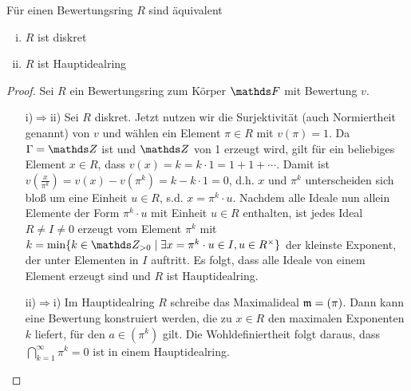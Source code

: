 \documentclass[ngerman,fontsize=11pt, paper=a4, parskip=half, titlepage=true, toc=bib]{scrartcl}
\begin{document}
\begin{Lem}\label{bewertungsringhir}
  Für einen Bewertungsring $R$ sind äquivalent
  \begin{enumerate}[i)]
  \item $R$ ist diskret
  \item $R$ ist Hauptidealring
  \end{enumerate}
  \begin{proof}
    Sei $R$ ein Bewertungsring zum Körper $\F$ mit Bewertung $v$.
    \begin{itemize}
    \item[i)$\Rightarrow$ii)] Sei $R$ diskret.
      Jetzt nutzen wir die Surjektivität (auch 
      Normiertheit genannt) von $v$ und wählen ein Element $\pi\in R$
      mit $v(\pi)=1$. Da $\Gamma=\Z$ ist und $\Z$ von 1 erzeugt wird,
      gilt für ein beliebiges Element $x\in R$, dass 
      $v(x)=k=k\cdot 1=1+1+\dotsb$. Damit ist 
      $v(\frac{x}{\pi^k})=v(x)-v(\pi^k)= k-k\cdot 1=0$, d.h. $x$ und 
      $\pi^k$ unterscheiden sich bloß um eine Einheit $u\in R$, s.d.
      $x=\pi^k \cdot u$.
      Nachdem alle Ideale nun allein Elemente der Form $\pi^k\cdot u$
      mit Einheit $u\in R$ enthalten, ist jedes Ideal $R\neq I\neq 0$ 
      erzeugt vom Element $\pi^k$ mit 
      $k=\min\{k\in\Z_{>0}\mid \exists x=\pi^k\cdot u\in I, u\in R^\times\}$
      der kleinste Exponent, der unter Elementen in $I$ auftritt.
      Es folgt, dass alle Ideale von einem Element erzeugt sind und
      $R$ ist Hauptidealring.
    \item[ii)$\Rightarrow$i)] Im Hauptidealring $R$ schreibe das 
      Maximalideal $\mathfrak{m}=(\pi)$. Dann kann eine Bewertung
      konstruiert werden, die zu $x\in R$ den maximalen Exponenten $k$ liefert, 
      für den $a\in (\pi^k)$ gilt.
      Die Wohldefiniertheit folgt daraus, dass
      $\bigcap_{k=1}^{\infty}\pi^k=0$ ist in einem Hauptidealring.
    \end{itemize}
  \end{proof}
\end{Lem}
\end{document}
